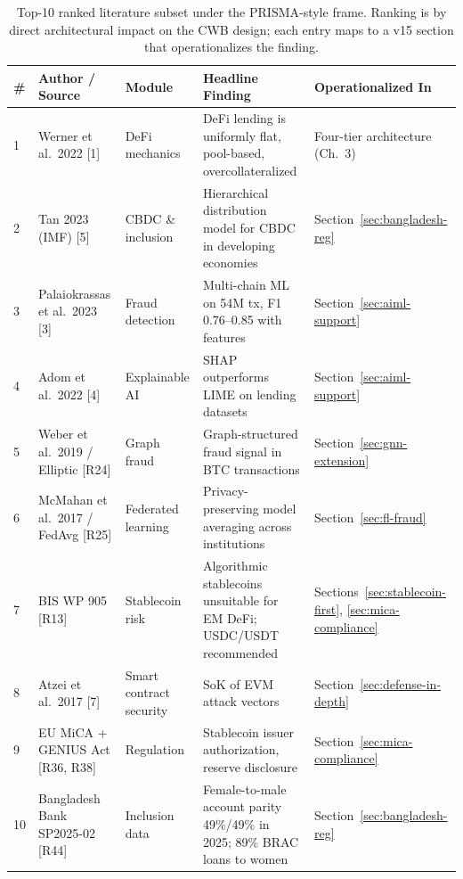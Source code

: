 \documentclass[12pt,a4paper]{report}
\begin{document}
\begin{table}[H]
\centering
\caption{Top-10 ranked literature subset under the PRISMA-style frame. Ranking is by direct architectural impact on the CWB design; each entry maps to a v15 section that operationalizes the finding.}
\label{tab:lit-top10}
\small
\renewcommand{\arraystretch}{1.15}
\begin{tabular}{p{0.4cm}p{3.4cm}p{3.0cm}p{3.0cm}p{3.4cm}}
\hline
\textbf{\#} & \textbf{Author / Source} & \textbf{Module} & \textbf{Headline Finding} & \textbf{Operationalized In} \\
\hline
1 & Werner et al.\ 2022 [1] & DeFi mechanics & DeFi lending is uniformly flat, pool-based, overcollateralized & Four-tier architecture (Ch.~3) \\
\hline
2 & Tan 2023 (IMF) [5] & CBDC \& inclusion & Hierarchical distribution model for CBDC in developing economies & Section~\ref{sec:bangladesh-reg} \\
\hline
3 & Palaiokrassas et al.\ 2023 [3] & Fraud detection & Multi-chain ML on 54M tx, F1 0.76--0.85 with features & Section~\ref{sec:aiml-support} \\
\hline
4 & Adom et al.\ 2022 [4] & Explainable AI & SHAP outperforms LIME on lending datasets & Section~\ref{sec:aiml-support} \\
\hline
5 & Weber et al.\ 2019 / Elliptic [R24] & Graph fraud & Graph-structured fraud signal in BTC transactions & Section~\ref{sec:gnn-extension} \\
\hline
6 & McMahan et al.\ 2017 / FedAvg [R25] & Federated learning & Privacy-preserving model averaging across institutions & Section~\ref{sec:fl-fraud} \\
\hline
7 & BIS WP 905 [R13] & Stablecoin risk & Algorithmic stablecoins unsuitable for EM DeFi; USDC/USDT recommended & Sections~\ref{sec:stablecoin-first}, \ref{sec:mica-compliance} \\
\hline
8 & Atzei et al.\ 2017 [7] & Smart contract security & SoK of EVM attack vectors & Section~\ref{sec:defense-in-depth} \\
\hline
9 & EU MiCA + GENIUS Act [R36, R38] & Regulation & Stablecoin issuer authorization, reserve disclosure & Section~\ref{sec:mica-compliance} \\
\hline
10 & Bangladesh Bank SP2025-02 [R44] & Inclusion data & Female-to-male account parity 49\%/49\% in 2025; 89\% BRAC loans to women & Section~\ref{sec:bangladesh-reg} \\
\hline
\end{tabular}
\end{table}
\end{document}
